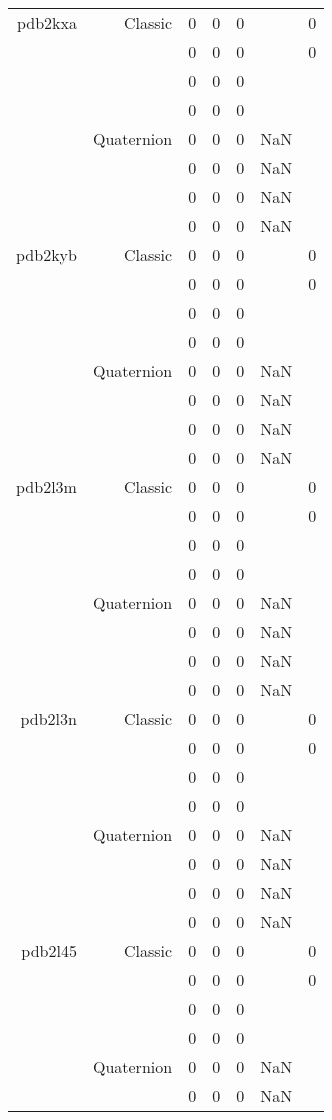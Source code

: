 \begin{xltabular}{\textwidth}{r|rcccSc}
pdb2kxa & Classic & 0 & 0 & 0 & & 0 \\
& & 0 & 0 & 0 & & 0 \\
& & 0 & 0 & 0 & & \\
& & 0 & 0 & 0 & & \\
& Quaternion & 0 & 0 & 0 & NaN & \\
& & 0 & 0 & 0 & NaN & \\
& & 0 & 0 & 0 & NaN & \\
& & 0 & 0 & 0 & NaN & \\ \addlinespace
pdb2kyb & Classic & 0 & 0 & 0 & & 0 \\
& & 0 & 0 & 0 & & 0 \\
& & 0 & 0 & 0 & & \\
& & 0 & 0 & 0 & & \\
& Quaternion & 0 & 0 & 0 & NaN & \\
& & 0 & 0 & 0 & NaN & \\
& & 0 & 0 & 0 & NaN & \\
& & 0 & 0 & 0 & NaN & \\ \addlinespace
pdb2l3m & Classic & 0 & 0 & 0 & & 0 \\
& & 0 & 0 & 0 & & 0 \\
& & 0 & 0 & 0 & & \\
& & 0 & 0 & 0 & & \\
& Quaternion & 0 & 0 & 0 & NaN & \\
& & 0 & 0 & 0 & NaN & \\
& & 0 & 0 & 0 & NaN & \\
& & 0 & 0 & 0 & NaN & \\ \addlinespace
pdb2l3n & Classic & 0 & 0 & 0 & & 0 \\
& & 0 & 0 & 0 & & 0 \\
& & 0 & 0 & 0 & & \\
& & 0 & 0 & 0 & & \\
& Quaternion & 0 & 0 & 0 & NaN & \\
& & 0 & 0 & 0 & NaN & \\
& & 0 & 0 & 0 & NaN & \\
& & 0 & 0 & 0 & NaN & \\ \addlinespace
pdb2l45 & Classic & 0 & 0 & 0 & & 0 \\
& & 0 & 0 & 0 & & 0 \\
& & 0 & 0 & 0 & & \\
& & 0 & 0 & 0 & & \\
& Quaternion & 0 & 0 & 0 & NaN & \\
& & 0 & 0 & 0 & NaN & \\

\end{xltabular}
